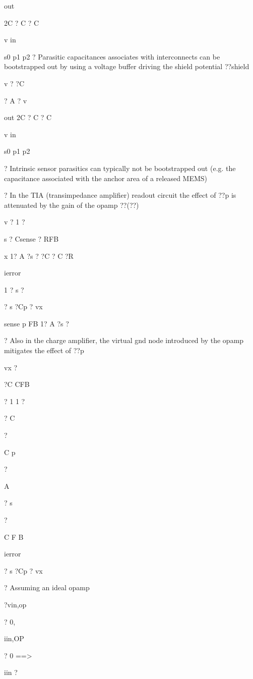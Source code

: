 \documentclass[2pt,landscape]{article}
\begin{document}
\begin{multicols*}{5}
out


2C	? C	? C


v	in


s0	p1	p2
?	Parasitic capacitances associates with interconnects can be bootstrapped out
by using a voltage buffer driving the shield potential ??shield


v	?	?C


? A ? v


out	2C	? C	? C


v	in


s0	p1	p2

?	Intrinsic sensor parasitics can typically not be bootstrapped out (e.g. the 
capacitance associated with the anchor area of a released MEMS)



?	In the TIA (transimpedance 
amplifier) readout circuit the 
effect of ??p is attenuated by the 
gain of the opamp ??(??)


v	?	1	?


s ? Csense ? RFB




x	1? A ?s ?	?C	? C ?R	



ierror


1
? 
s ?

? s ?Cp ? vx


sense	p	FB
1? A ?s ?



?	Also in the charge amplifier, the 
virtual gnd node introduced by 
the opamp mitigates the effect 
of ??p


vx ?


?C CFB


?	1
1
?

?
C

?

C
p

?

A

?
s

?

C
F
B


ierror


? s ?Cp ? vx



?	Assuming an ideal opamp


?vin,op


? 0,


iin,OP


? 0 ==>


iin ?



\end{multicols*}
\end{document}
